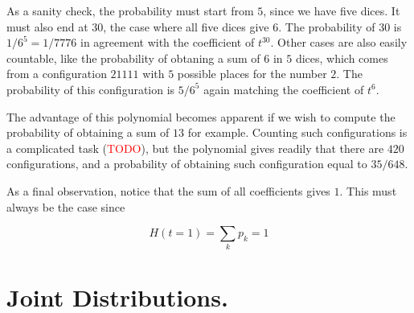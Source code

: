 \documentclass[12pt]{article}
\begin{document}
\noindent
As a sanity check, the probability must start from $5$, since we have five dices.
It must also end at $30$, the case where all five dices give $6$.
The probability of $30$ is $1/6^{5} = 1/7776$ in agreement with the coefficient of
$t^{30}$. Other cases are also easily countable, like the probability of obtaning a sum of $6$ in
$5$ dices, which comes from a configuration $21111$ with $5$ possible places for the number $2$.
The probability of this configuration is $5 / 6^{5}$ again matching the coefficient of $t^{6}$.

The advantage of this polynomial becomes apparent if we wish to compute the probability of obtaining 
a sum of $13$ for example. Counting such configurations is a complicated task
(\textcolor{red}{TODO}), but the polynomial gives readily that there are $420$ configurations, 
and a probability of obtaining such configuration equal to $35/648$.

As a final observation, notice that the sum of all coefficients gives $1$.
This must always be the case since

\begin{equation}
H(t = 1) = \sum_{k} p_{k} = 1
\end{equation}

\section{Joint Distributions.}
\end{document}
